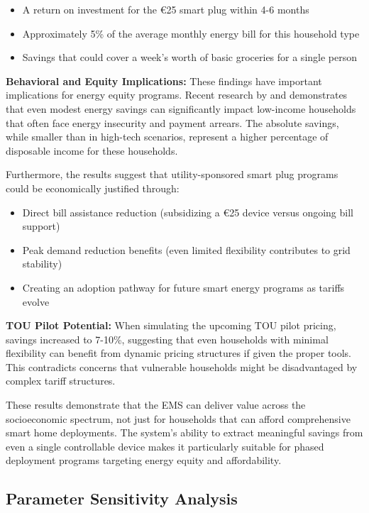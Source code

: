 \documentclass[12pt,a4paper]{article}
\begin{document}
\begin{itemize}
    \item A return on investment for the \euro{25} smart plug within 4-6 months
    \item Approximately 5\% of the average monthly energy bill for this household type
    \item Savings that could cover a week's worth of basic groceries for a single person
\end{itemize}

\textbf{Behavioral and Equity Implications:} These findings have important implications for energy equity programs. Recent research by \cite{Bednar2023} and \cite{Reames2021} demonstrates that even modest energy savings can significantly impact low-income households that often face energy insecurity and payment arrears. The absolute savings, while smaller than in high-tech scenarios, represent a higher percentage of disposable income for these households.

Furthermore, the results suggest that utility-sponsored smart plug programs could be economically justified through:

\begin{itemize}
    \item Direct bill assistance reduction (subsidizing a \euro{25} device versus ongoing bill support)
    \item Peak demand reduction benefits (even limited flexibility contributes to grid stability)
    \item Creating an adoption pathway for future smart energy programs as tariffs evolve
\end{itemize}

\textbf{TOU Pilot Potential:} When simulating the upcoming TOU pilot pricing, savings increased to 7-10\%, suggesting that even households with minimal flexibility can benefit from dynamic pricing structures if given the proper tools. This contradicts concerns that vulnerable households might be disadvantaged by complex tariff structures.

These results demonstrate that the EMS can deliver value across the socioeconomic spectrum, not just for households that can afford comprehensive smart home deployments. The system's ability to extract meaningful savings from even a single controllable device makes it particularly suitable for phased deployment programs targeting energy equity and affordability.

\subsection{Parameter Sensitivity Analysis}
\end{document}
